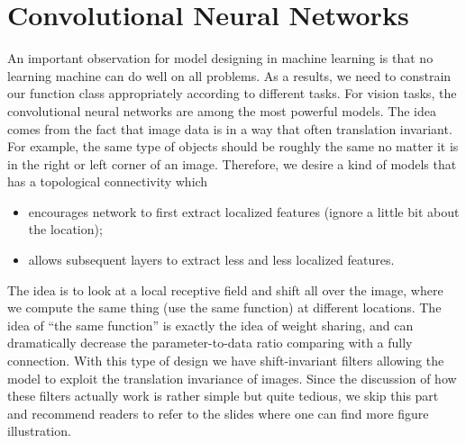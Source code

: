 \documentclass[../main.tex]{subfiles}
\begin{document}
\section{Convolutional Neural Networks}
An important observation for model designing in machine learning is that no learning machine can do well on all problems. As a results, we need to constrain our function class appropriately according to different tasks. For vision tasks, the convolutional neural networks are among the most powerful models. The idea comes from the fact that image data is in a way that often translation invariant. For example, the same type of objects should be roughly the same no matter it is in the right or left corner of an image. Therefore, we desire a kind of models that has a topological connectivity which
\begin{itemize}
	\item encourages network to first extract localized features (ignore a little bit about the location);
	\item allows subsequent layers to extract less and less localized features.
\end{itemize}
The idea is to look at a local receptive field and shift all over the image, where we compute the same thing (use the same function) at different locations. The idea of ``the same function'' is exactly the idea of weight sharing, and can dramatically decrease the parameter-to-data ratio comparing with a fully connection. With this type of design we have shift-invariant filters allowing the model to exploit the translation invariance of images. Since the discussion of how these filters actually work is rather simple but quite tedious, we skip this part and recommend readers to refer to the slides where one can find more figure illustration.
\end{document}
